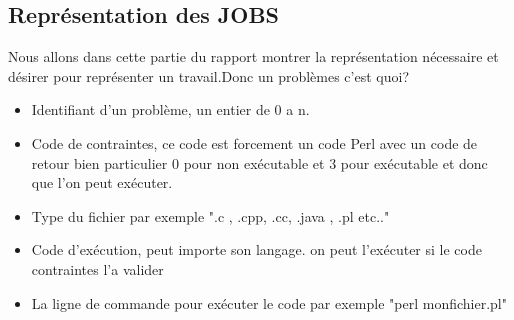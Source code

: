 \documentclass[11pt]{article}
\begin{document}
\newpage

 





\newpage
\subsection{Représentation des JOBS}
Nous allons dans cette partie du rapport montrer la représentation nécessaire et désirer pour représenter un travail.Donc un problèmes c'est quoi? 

\begin{itemize}
\item Identifiant d'un problème, un entier de 0 a n.
\item Code de contraintes, ce code est forcement un code Perl avec un code de retour bien particulier 0 pour non exécutable  et 3 pour exécutable et donc que l'on peut exécuter. 
\item Type du fichier par exemple ".c , .cpp, .cc, .java , .pl etc.."
\item Code d'exécution, peut importe son langage. on peut l'exécuter si le code contraintes l'a valider 
\item La ligne de commande pour exécuter le code par exemple "perl monfichier.pl"
\end{itemize}

\inputminted{XML}{../Schema_XML/BDD_JOB.xsd}
\newpage 
\end{document}
